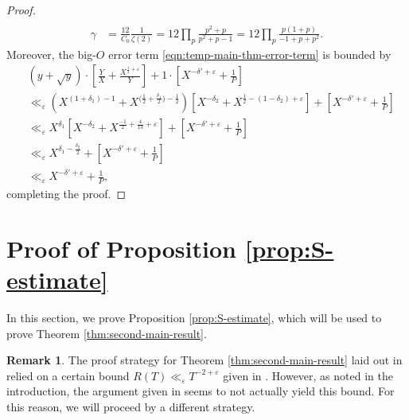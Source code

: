 \documentclass[12pt,letterpaper,reqno]{amsart}
\theoremstyle{plain}
\theoremstyle{definition}
\newtheorem{remark}[theorem]{Remark}
\numberwithin{equation}{section}
\numberwithin{figure}{section}
\numberwithin{table}{section}
\newcommand{\lrp}[1]{\!\left(#1\right)}
\newcommand{\lrb}[1]{\!\left[#1\right]}
\begin{document}
\begin{proof}
\begin{align}
    \\
    \gamma &= \frac{12}{C_0} \frac{1}{\zeta(2)} = 12 \prod_p \frac{p^2+p}{p^2+p-1} = 12 \prod_p \frac{p(1+p)}{-1+p+p^2}.
\end{align}
Moreover, the big-$O$ error term \eqref{eqn:temp-main-thm-error-term} is bounded by
\begin{align}
    & (y+\sqrt y) \cdot
        \lrb{
            \frac{Y}{X} + \frac{X^{\frac{1}{2}+\varepsilon}}{Y} 
        }
        +
        1 \cdot 
        \lrb{
            X^{-\delta'+\varepsilon} + \frac{1}{P}
        } \\
    &\ll_\varepsilon  
        \lrp{
            X^{(1+\delta_1)-1} + X^{\big(\frac{1}{2} + \frac{\delta_1}{2}\big) - \frac{1}{2}}
        }
        \lrb{
            X^{-\delta_2}
            + X^{\frac{1}{2} - (1 - \delta_2)+\varepsilon}
        }
        +
        \lrb{X^{-\delta'+\varepsilon} + \frac{1}{P}} \\
    &\ll_\varepsilon 
        X^{\delta_1} 
        \lrb{
            X^{-\delta_2}
            + X^{\frac{-1}{2} + \frac{4}{13} +\varepsilon}
        }
        +
        \lrb{X^{-\delta'+\varepsilon} + \frac{1}{P}} \\
    &\ll_\varepsilon 
    X^{\delta_1 - \frac{\delta_2}{2}} + \lrb{X^{-\delta'+\varepsilon} + \frac{1}{P}} \\
    &\ll_\varepsilon 
    X^{-\delta'+\varepsilon} + \frac{1}{P},
\end{align}
completing the proof.
\end{proof}






\section{Proof of Proposition \ref{prop:S-estimate}} 
\label{sec:proof-of-prop-S-estimate}

In this section, we prove Proposition \ref{prop:S-estimate}, which will be used to prove Theorem \ref{thm:second-main-result}.


\begin{remark}
    The proof strategy for Theorem \ref{thm:second-main-result} laid out in \cite{Zubrilina} relied on a certain bound $R(T) \ll_\varepsilon  T^{-2+\varepsilon}$ given in \cite[Lemma 7.3]{Zubrilina}. However, as noted in the introduction, the argument given in \cite{Zubrilina} seems to not actually yield this bound. For this reason, we will proceed by a different strategy.
\end{remark}
\end{document}
